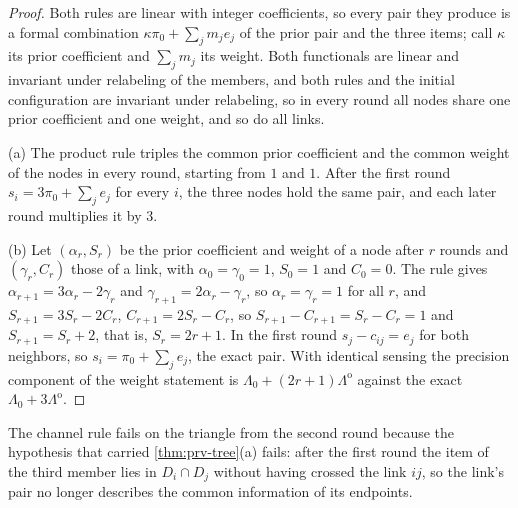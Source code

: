 \begin{proof}
Both rules are linear with integer coefficients, so every pair they produce is a formal combination $\kappa\pi_0+\sum_jm_je_j$ of the prior pair and the three items; call $\kappa$ its prior coefficient and $\sum_jm_j$ its weight. Both functionals are linear and invariant under relabeling of the members, and both rules and the initial configuration are invariant under relabeling, so in every round all nodes share one prior coefficient and one weight, and so do all links.

(a) The product rule triples the common prior coefficient and the common weight of the nodes in every round, starting from $1$ and $1$. After the first round $s_i=3\pi_0+\sum_je_j$ for every $i$, the three nodes hold the same pair, and each later round multiplies it by $3$.

(b) Let $(\alpha_r,S_r)$ be the prior coefficient and weight of a node after $r$ rounds and $(\gamma_r,C_r)$ those of a link, with $\alpha_0=\gamma_0=1$, $S_0=1$ and $C_0=0$. The rule gives $\alpha_{r+1}=3\alpha_r-2\gamma_r$ and $\gamma_{r+1}=2\alpha_r-\gamma_r$, so $\alpha_r=\gamma_r=1$ for all $r$, and $S_{r+1}=3S_r-2C_r$, $C_{r+1}=2S_r-C_r$, so $S_{r+1}-C_{r+1}=S_r-C_r=1$ and $S_{r+1}=S_r+2$, that is, $S_r=2r+1$. In the first round $s_j-c_{ij}=e_j$ for both neighbors, so $s_i=\pi_0+\sum_je_j$, the exact pair. With identical sensing the precision component of the weight statement is $\Lambda_0+(2r+1)\Lambda^{\mathrm o}$ against the exact $\Lambda_0+3\Lambda^{\mathrm o}$.
\end{proof}

The channel rule fails on the triangle from the second round because the hypothesis that carried \cref{thm:prv-tree}(a) fails: after the first round the item of the third member lies in $D_i\cap D_j$ without having crossed the link $ij$, so the link's pair no longer describes the common information of its endpoints.

